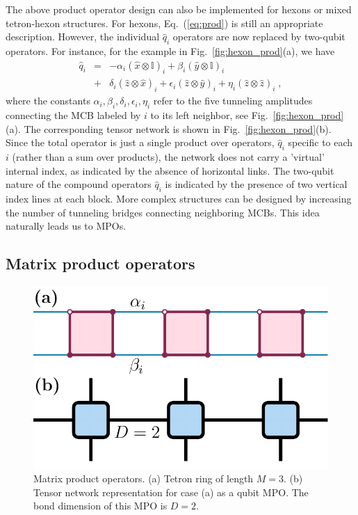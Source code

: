 \documentclass[twocolumn,floats,prx,showpacs]{revtex4-1}
\newcommand{\id}{\mathbb{I}}
\def\id{\mathbb{I}}
\begin{document}
The above product operator design can also be implemented for hexons or mixed tetron-hexon structures. For hexons, Eq.~(\ref{eq:prod}) is still an appropriate description. However, the individual $\hat q_i$ operators are now replaced by two-qubit operators. For instance, for the example in Fig.~\ref{fig:hexon_prod}(a), we have
\begin{eqnarray}
\hat q_i &=& -\alpha_i (\hat x \otimes \id)_i + 
\beta_i (\hat y \otimes \id)_i \nonumber \\
&+& \delta_i (\hat z \otimes \hat x)_i +\epsilon_i 
(\hat z \otimes \hat y )_i +\eta_i (\hat z \otimes \hat z)_i\;,
\end{eqnarray}
where the constants $\alpha_i,\beta_i,\delta_i,\epsilon_i,\eta_i$ refer to the five tunneling amplitudes connecting the MCB labeled by $i$ to its left neighbor, see Fig.~\ref{fig:hexon_prod}(a).
The corresponding tensor network is shown in Fig.~\ref{fig:hexon_prod}(b). Since the total operator is just a single product over operators, $\hat q_i$ specific to each $i$ (rather than a sum over products), the network does not carry a 'virtual' internal index, as indicated by the absence of  horizontal links. The two-qubit nature of the compound operators $\hat q_i$ is indicated by the presence of two vertical index lines at each block.   More complex structures can be designed by 
increasing the number of tunneling bridges connecting neighboring MCBs. 
This idea naturally leads us to MPOs.

\subsection{Matrix product operators}\label{sec3b}

\begin{figure}
\includegraphics[width=0.62\columnwidth]{fig/MPO.pdf}
\caption{Matrix product operators. (a) Tetron ring of length $M=3$.  (b) Tensor network representation for case (a) as a qubit MPO. The bond dimension of this MPO is $D=2$. }
\label{fig:mpo}
\end{figure}
\end{document}
